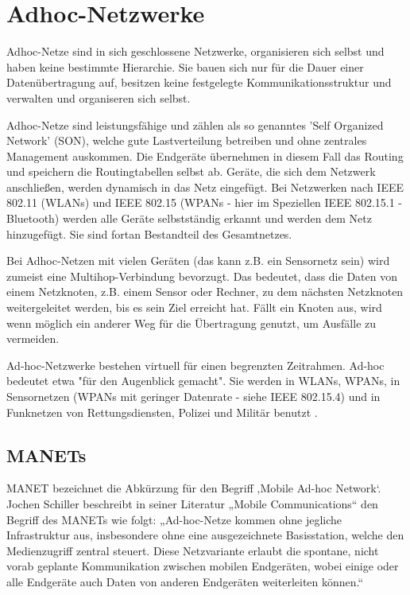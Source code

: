 \section{Adhoc-Netzwerke}\label{s:AdhocNetzwerke}

Adhoc-Netze sind in sich geschlossene Netzwerke, organisieren sich selbst und haben keine bestimmte Hierarchie. Sie bauen sich nur für die Dauer einer Datenübertragung auf, besitzen keine festgelegte Kommunikationsstruktur und verwalten und organiseren sich selbst. 

Adhoc-Netze sind leistungsfähige und zählen als so genanntes 'Self Organized Network' (SON), welche gute Lastverteilung betreiben und ohne zentrales Management auskommen. Die Endgeräte übernehmen in diesem Fall das Routing und speichern die Routingtabellen selbst ab. Geräte, die sich dem Netzwerk anschließen, werden dynamisch in das Netz eingefügt. Bei Netzwerken nach IEEE 802.11 (WLANs) und IEEE 802.15 (WPANs - hier im Speziellen IEEE 802.15.1 - Bluetooth) werden alle Geräte selbstständig erkannt und werden dem Netz hinzugefügt. Sie sind fortan Bestandteil des Gesamtnetzes. 

Bei Adhoc-Netzen mit vielen Geräten (das kann z.B. ein Sensornetz sein) wird zumeist eine Multihop-Verbindung bevorzugt. Das bedeutet, dass die Daten von einem Netzknoten, z.B. einem Sensor oder Rechner, zu dem nächsten Netzknoten weitergeleitet werden, bis es sein Ziel erreicht hat. Fällt ein Knoten aus, wird wenn möglich ein anderer Weg für die Übertragung genutzt, um Ausfälle zu vermeiden.

Ad-hoc-Netzwerke bestehen virtuell für einen begrenzten Zeitrahmen. Ad-hoc bedeutet etwa "für den Augenblick gemacht". Sie werden in WLANs, WPANs, in Sensornetzen (WPANs mit geringer Datenrate - siehe IEEE 802.15.4) und in Funknetzen von Rettungsdiensten, Polizei und Militär benutzt \cite{ws:lipinski}.

\subsection{MANETs}\label{ss:MANETs}

MANET bezeichnet die Abkürzung für den Begriff ‚Mobile Ad-hoc Network‘. Jochen Schiller beschreibt in seiner Literatur „Mobile Communications“ den Begriff des MANETs wie folgt: „Ad-hoc-Netze kommen ohne jegliche Infrastruktur aus, insbesondere ohne eine ausgezeichnete Basisstation, welche den Medienzugriff zentral steuert. Diese Netzvariante erlaubt die spontane, nicht vorab geplante Kommunikation zwischen mobilen Endgeräten, wobei einige oder alle Endgeräte auch Daten von anderen Endgeräten weiterleiten können.“


